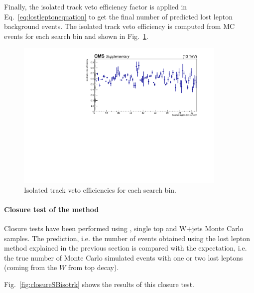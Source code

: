 Finally, the isolated track veto efficiency factor is applied in 
Eq.~\ref{eq:lostleptonequation}
to get the final number of predicted lost lepton background events.
The isolated track veto efficiency is computed from MC events 
for each search bin and shown in Fig.~\ref{fig:isotrackeff}.

\begin{figure}[htbp]
\begin{center}
\includegraphics[width=0.9\textwidth]{sections/mc4/Backgrounds/LostLepton/figures/v2_isotrackvetoEff.pdf}%
\end{center}
\caption{Isolated track veto efficiencies for each search bin.}
\label{fig:isotrackeff}
\end{figure}

\paragraph{Closure test of the method}

Closure tests have been performed using \ttbar, single top and W$+$jets Monte Carlo samples. 
The prediction, i.e. the number of events obtained using the lost lepton 
method explained in the previous section is compared with the expectation, 
i.e. the true number of Monte Carlo simulated events with one or two 
lost leptons (coming from the $W$ from top decay). 

Fig.~\ref{fig:closureSBisotrk} shows the results of this closure test.

